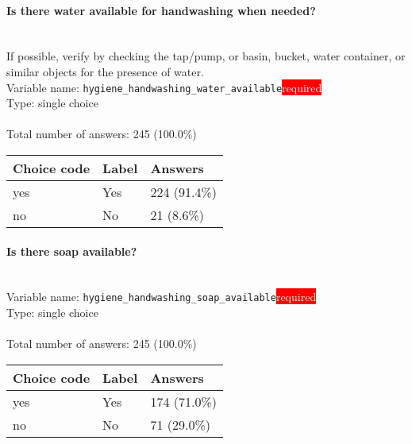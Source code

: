 \documentclass[11.5pt, a4paper]{scrartcl}
\begin{document}
\paragraph{Is there water available for handwashing when needed?}
\ \\ {\small If possible, verify by checking the tap/pump, or basin, bucket, water container, or similar objects for the presence of water. }
\  \\Variable name: \texttt{hygiene\_handwashing\_water\_available}\hfill\colorbox{red}{\small{\textcolor{white}{required}}}\\
 Type: single choice\\
\\Total number of answers: 245 (100.0\%)
\\[0.2em] \begin{tabular}{p{4cm}|p{8cm}|p{3cm}}
Choice code & Label & Answers \\
\hline
yes & Yes& \cellcolor{color4}224 (91.4\%)\\
\cellcolor{mygray} no & \cellcolor{mygray}No & \cellcolor{color0}21 (8.6\%)\\
\end{tabular}
\paragraph{Is there soap available?}
\  \\Variable name: \texttt{hygiene\_handwashing\_soap\_available}\hfill\colorbox{red}{\small{\textcolor{white}{required}}}\\
 Type: single choice\\
\\Total number of answers: 245 (100.0\%)
\\[0.2em] \begin{tabular}{p{4cm}|p{8cm}|p{3cm}}
Choice code & Label & Answers \\
\hline
yes & Yes& \cellcolor{color3}174 (71.0\%)\\
\cellcolor{mygray} no & \cellcolor{mygray}No & \cellcolor{color1}71 (29.0\%)\\
\end{tabular}
\end{document}

